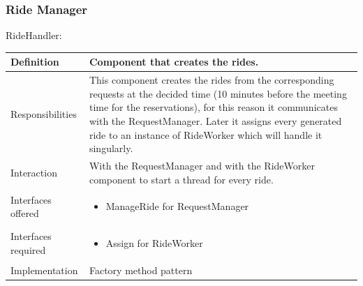 \documentclass[a4paper,11pt]{report} %
\begin{document}
	\subsubsection{Ride Manager}
	\begin{minipage}{\linewidth}
	\end{minipage} \linebreak
	\centerline{RideHandler:}
	\begin{center}
		\begin{tabular}{| l | p{9cm} |}\hline
			Definition & Component that creates the rides.\\\hline
			Responsibilities & This component creates the rides from the corresponding requests at the decided time (10 minutes before the meeting time for the reservations), for this reason it communicates with the RequestManager. Later it assigns every generated ride to an instance of RideWorker which will handle it singularly.\\\hline
			Interaction & With the RequestManager and with the RideWorker component to start a thread for every ride.\\\hline
			Interfaces offered & \begin{itemize}
				\item ManageRide for RequestManager
			\end{itemize}\\\hline
			Interfaces required & \begin{itemize}
				\item Assign for RideWorker
			\end{itemize}\\\hline
			Implementation & Factory method pattern\\\hline
		\end{tabular}
	\end{center}
	
\end{document}

